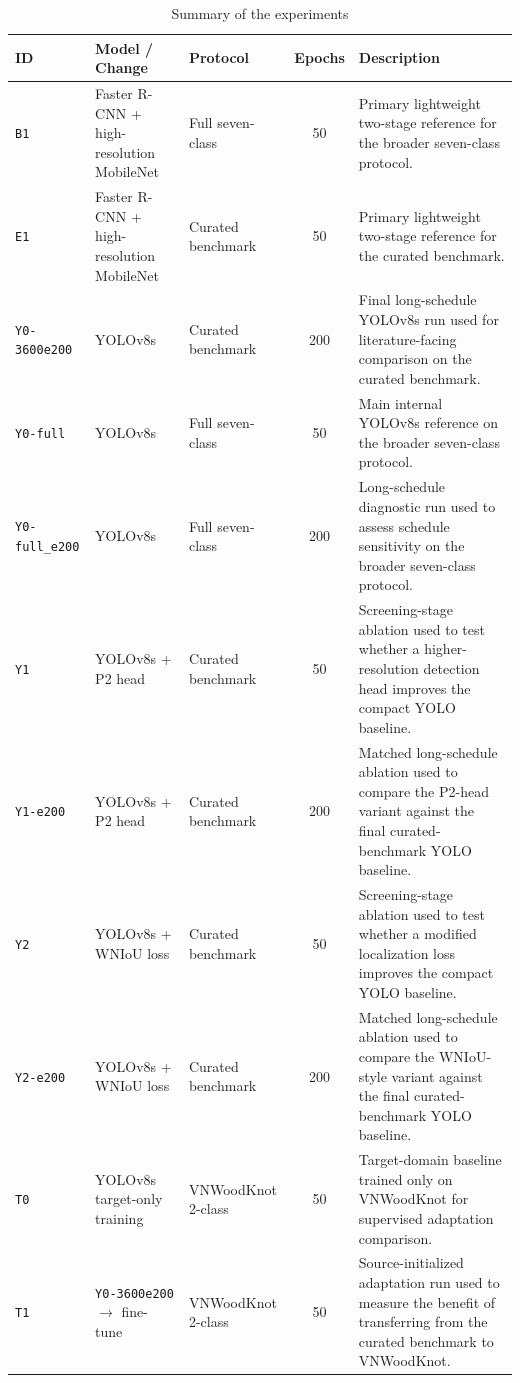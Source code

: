 \documentclass[10pt,a4paper]{article}
\begin{document}
\begin{table}[t]
  \centering
  \caption{Summary of the experiments}
  \label{tab:experiment-summary}
  \scriptsize
  \setlength{\tabcolsep}{4pt}
  \begin{tabularx}{\textwidth}{>{\raggedright\arraybackslash}p{} >{\raggedright\arraybackslash}p{} >{\raggedright\arraybackslash}p{} c X}
    \toprule
    ID & Model / Change & Protocol & Epochs & Description \\
    \midrule
    \texttt{B1} & Faster R-CNN + high-resolution MobileNet & Full seven-class & 50 & Primary lightweight two-stage reference for the broader seven-class protocol. \\
    \texttt{E1} & Faster R-CNN + high-resolution MobileNet & Curated benchmark & 50 & Primary lightweight two-stage reference for the curated benchmark. \\
    \texttt{Y0-3600e200} & YOLOv8s & Curated benchmark & 200 & Final long-schedule YOLOv8s run used for literature-facing comparison on the curated benchmark. \\
    \texttt{Y0-full} & YOLOv8s & Full seven-class & 50 & Main internal YOLOv8s reference on the broader seven-class protocol. \\
    \texttt{Y0-full\_e200} & YOLOv8s & Full seven-class & 200 & Long-schedule diagnostic run used to assess schedule sensitivity on the broader seven-class protocol. \\
    \texttt{Y1} & YOLOv8s + P2 head & Curated benchmark & 50 & Screening-stage ablation used to test whether a higher-resolution detection head improves the compact YOLO baseline. \\
    \texttt{Y1-e200} & YOLOv8s + P2 head & Curated benchmark & 200 & Matched long-schedule ablation used to compare the P2-head variant against the final curated-benchmark YOLO baseline. \\
    \texttt{Y2} & YOLOv8s + WNIoU loss & Curated benchmark & 50 & Screening-stage ablation used to test whether a modified localization loss improves the compact YOLO baseline. \\
    \texttt{Y2-e200} & YOLOv8s + WNIoU loss & Curated benchmark & 200 & Matched long-schedule ablation used to compare the WNIoU-style variant against the final curated-benchmark YOLO baseline. \\
    \texttt{T0} & YOLOv8s target-only training & VNWoodKnot 2-class & 50 & Target-domain baseline trained only on VNWoodKnot for supervised adaptation comparison. \\
    \texttt{T1} & \texttt{Y0-3600e200} $\rightarrow$ fine-tune & VNWoodKnot 2-class & 50 & Source-initialized adaptation run used to measure the benefit of transferring from the curated benchmark to VNWoodKnot. \\
    \bottomrule
  \end{tabularx}
\end{table}
\end{document}
